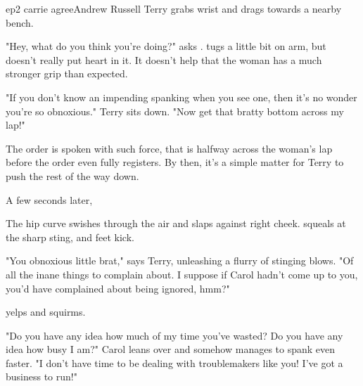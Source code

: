 \documentclass{book}
\begin{document}
\begin{childnode}{ep2 carrie agree}{Andrew Russell}
    Terry grabs \names{} wrist and drags \himher{} towards a nearby bench. 

    "Hey, what do you think you're doing?" asks \name{}. \HeShe{} tugs a little bit on \hisher{} arm, but doesn't really put \hisher{} heart in it. It doesn't help that the woman has a much
    stronger grip than \name{} expected.

    "If you don't know an impending spanking when you see one, then it's no wonder you're so obnoxious." Terry sits down. "Now get that bratty bottom across my lap!"

    The order is spoken with such force, that \name{} is halfway across the woman's lap before the order even fully registers. By then, it's a simple matter for Terry to push \himher{} the rest of
    the way down.

    A few seconds later, \names{} 
    
    The hip curve swishes through the air and slaps against \names{} 
    right cheek. \name{} squeals at the sharp sting, and \hisher{} feet kick.

    "You obnoxious little brat," says Terry, unleashing a flurry of stinging blows. "Of all the inane things to complain about. I suppose if Carol hadn't come up to you, you'd have complained about
     being ignored, hmm?"

     \name{} yelps and squirms.

     "Do you have any idea how much of my time you've wasted? Do you have any idea how busy I am?" Carol leans over and somehow manages to spank \name{} even faster. "I don't have time to be 
     dealing with troublemakers like you! I've got a business to run!"


\end{childnode}
\end{document}
